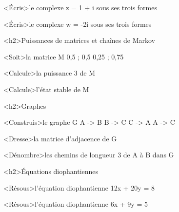 \documentclass[marges=20, taille=11, precision=3]{texecole}
\begin{document}
<Écris>le complexe z = 1 + i sous ses trois formes

<Écris>le complexe w = -2i sous ses trois formes

<h2>Puissances de matrices et chaînes de Markov

<Soit>la matrice M {
	0,5 ; 0,5
	0,25 ; 0,75
}

<Calcule>la puissance 3 de M

<Calcule>l'état stable de M

<h2>Graphes

<Construis>le graphe G {
	A -> B
	B -> C
	C -> A
	A -> C
}

<Dresse>la matrice d'adjacence de G

<Dénombre>les chemins de longueur 3 de A à B dans G

<h2>Équations diophantiennes

<Résous>l'équation diophantienne 12x + 20y = 8

<Résous>l'équation diophantienne 6x + 9y = 5
\end{document}
